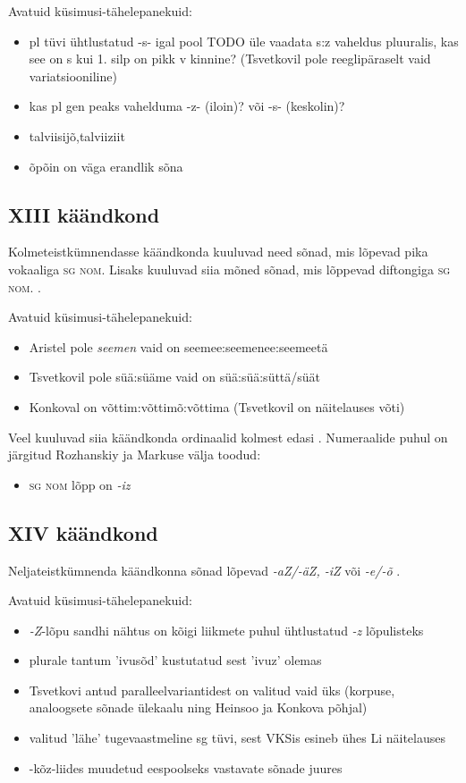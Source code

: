 \documentclass[12pt,a4paper]{article}
\newcommand{\vadja}[1]{\textit{#1}}
\newcommand{\msd}[1]{\textsc{#1}}
\begin{document}
Avatuid küsimusi-tähelepanekuid:
\begin{itemize}
\item pl tüvi ühtlustatud -s- igal pool TODO üle vaadata s:z vaheldus pluuralis, kas see on s kui 1. silp on pikk v kinnine? (Tsvetkovil pole reeglipäraselt vaid variatsiooniline)
\item kas pl gen peaks vahelduma -z- (iloin)? või -s- (keskolin)?
\item talviisijõ,talviiziit
\item õpõin on väga erandlik sõna
\end{itemize}


\subsection{\RN{13} käändkond}

Kolmeteistkümnendasse käändkonda kuuluvad need sõnad, mis lõpevad pika vokaaliga \msd{sg nom}. Lisaks kuuluvad siia mõned sõnad, mis lõppevad diftongiga \msd{sg nom}. \cite[49]{ariste_grammar_1968}.

Avatuid küsimusi-tähelepanekuid:
\begin{itemize}
\item Aristel pole \vadja{seemen} vaid on seemee:seemenee:seemeetä
\item Tsvetkovil pole süä:süäme vaid on süä:süä:süttä/süät
\item Konkoval on võttim:võttimõ:võttima (Tsvetkovil on näitelauses võti)
\end{itemize}

Veel kuuluvad siia käändkonda ordinaalid kolmest edasi \cite[50]{ariste_grammar_1968}.
Numeraalide puhul on järgitud Rozhanskiy ja Markuse välja toodud:
\begin{itemize}
\item \msd{sg nom} lõpp on \vadja{-iz}
\end{itemize}


\subsection{\RN{14} käändkond}

Neljateistkümnenda käändkonna sõnad lõpevad \vadja{-aZ/-äZ, -iZ} või \vadja{-e/-õ} \cite[50]{ariste_grammar_1968}.

Avatuid küsimusi-tähelepanekuid:
\begin{itemize}
\item \vadja{-Z}-lõpu sandhi nähtus on kõigi liikmete puhul ühtlustatud \vadja{-z} lõpulisteks
\item plurale tantum 'ivusõd' kustutatud sest 'ivuz' olemas
\item Tsvetkovi antud paralleelvariantidest on valitud vaid üks (korpuse, analoogsete sõnade ülekaalu ning Heinsoo ja Konkova põhjal)
\item valitud 'lähe' tugevaastmeline sg tüvi, sest VKSis esineb ühes Li näitelauses
\item -kõz-liides muudetud eespoolseks vastavate sõnade juures
\end{itemize}
\end{document}

